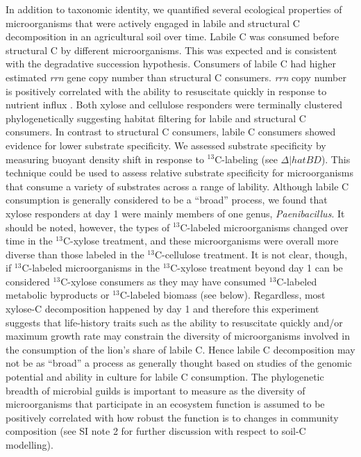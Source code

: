 In addition to taxonomic identity, we quantified several ecological
properties of microorganisms that were actively engaged in labile and
structural C decomposition in an agricultural soil over time. Labile C was consumed
before structural C by different microorganisms. This was expected and is
consistent with the degradative succession hypothesis. Consumers of labile C
had higher estimated \textit{rrn} gene copy number than structural C consumers.
\textit{rrn} copy number is positively correlated with the ability to
resuscitate quickly in response to nutrient influx \citep{Klappenbach_2000}.
Both xylose and cellulose responders were terminally clustered phylogenetically
suggesting habitat filtering for labile and structural C consumers. In contrast
to structural C consumers, labile C consumers showed evidence for lower
substrate specificity. We assessed substrate specificity by measuring buoyant
density shift in response to $^{13}$C-labeling (see $\Delta|hat{BD}$). This
technique could be used to  assess relative substrate specificity for
microorganisms that consume a variety of substrates across a range of lability.
Although labile C consumption is generally considered to be a ``broad''
process, we found that xylose responders at day 1 were mainly members of one
genus, \textit{Paenibacillus}.  It should be noted, however, the types of
$^{13}$C-labeled microorganisms changed over time in the $^{13}$C-xylose
treatment, and these microorganisms were overall more diverse than those
labeled in the $^{13}$C-cellulose treatment. It is not clear, though,  if
$^{13}$C-labeled microorganisms in the $^{13}$C-xylose treatment beyond day 1
can be considered $^{13}$C-xylose consumers as they may have consumed
$^{13}$C-labeled metabolic byproducts or $^{13}$C-labeled biomass (see below).
Regardless, most xylose-C decomposition happened by day 1 and therefore this
experiment suggests that life-history traits such as the ability to resuscitate
quickly and/or maximum growth rate may constrain the diversity of
microorganisms involved in the consumption of the lion's share of labile C.
Hence labile C decomposition may not be as ``broad'' a process as generally
thought based on studies of the genomic potential and ability in culture for
labile C consumption. The phylogenetic breadth of microbial guilds is important
to measure as the diversity of microorganisms that participate in an ecosystem
function is assumed to be positively correlated with how robust the function is
to changes in community composition \citep{Schimel_1995} (see SI note 2 for
further discussion with respect to soil-C modelling).

